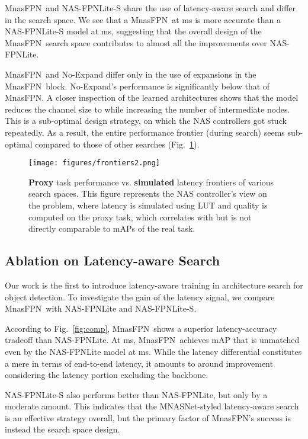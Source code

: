 \documentclass[10pt,twocolumn,letterpaper]{article}
\def\Mnasfpn{MnasFPN~}
\def\Mnasfpnnospace{MnasFPN}
\begin{document}
\Mnasfpn and NAS-FPNLite-S share the use of latency-aware search and differ in the search space. We see that a \Mnasfpn at  ms is more accurate than a NAS-FPNLite-S  model at  ms, suggesting that the overall design of the \Mnasfpn search space contributes to almost all the improvements over NAS-FPNLite. 

\Mnasfpn and No-Expand differ only in the use of expansions in the \Mnasfpn block. No-Expand's performance is significantly below that of \Mnasfpnnospace. A closer inspection of the learned architectures shows that the model reduces the channel size  to  while increasing the number of intermediate nodes. This is a sub-optimal design strategy, on which the NAS controllers got stuck repeatedly. As a result, the entire performance frontier (during search) seems sub-optimal compared to those of other searches (Fig.~\ref{fig:frontiers}).

\begin{figure}[!t]
    \centering
    \texttt{[image: figures/frontiers2.png]}
    \caption{{\bf Proxy} task performance vs. {\bf simulated} latency frontiers of various search spaces. This figure represents the NAS controller's view on the problem, where latency is simulated using LUT and quality is computed on the proxy task, which correlates with but is not directly comparable to mAPs of the real task.}
    \label{fig:frontiers}
\end{figure}


\subsection{Ablation on Latency-aware Search}
\label{sec:ablation-lat}
Our work is the first to introduce latency-aware training in architecture search for object detection. To investigate the gain of the latency signal, we compare \Mnasfpn with NAS-FPNLite and NAS-FPNLite-S. 

According to Fig.~\ref{fig:comp}, \Mnasfpn shows a superior latency-accuracy tradeoff than NAS-FPNLite. At  ms, \Mnasfpn achieves  mAP that is unmatched even by the NAS-FPNLite model at  ms. While the latency differential constitutes a mere  in terms of end-to-end latency, it amounts to around  improvement considering the latency portion excluding the backbone. 

NAS-FPNLite-S also performs better than NAS-FPNLite, but only by a moderate amount. This indicates that the MNASNet-styled latency-aware search is an effective strategy overall, but the primary factor of \Mnasfpnnospace's success is instead the search space design.
\end{document}
